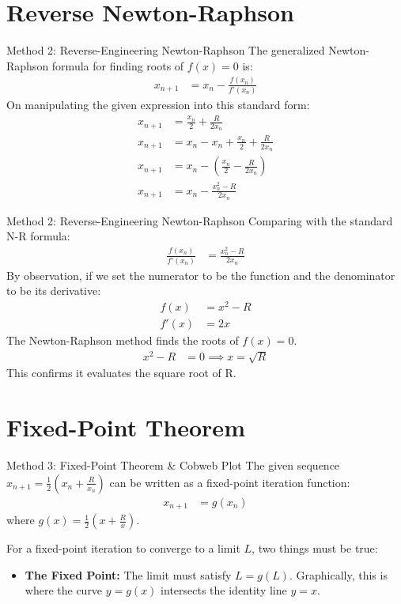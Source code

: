 \documentclass{beamer}
\theoremstyle{remark}
\numberwithin{equation}{section}
\begin{document}
\section{Reverse Newton-Raphson}
\begin{frame}{Method 2: Reverse-Engineering Newton-Raphson}
    The generalized Newton-Raphson formula for finding roots of $f(x) = 0$ is:
    \begin{align}
        x_{n+1} &= x_n - \frac{f(x_n)}{f'(x_n)}
    \end{align}
    On manipulating the given expression into this standard form:
    \begin{align}
        x_{n+1} &= \frac{x_n}{2} + \frac{R}{2x_n} \\
        x_{n+1} &= x_n - x_n + \frac{x_n}{2} + \frac{R}{2x_n} \\
        x_{n+1} &= x_n - \left( \frac{x_n}{2} - \frac{R}{2x_n} \right) \\
        x_{n+1} &= x_n - \frac{x_n^2 - R}{2x_n}
    \end{align}
\end{frame}

\begin{frame}{Method 2: Reverse-Engineering Newton-Raphson}
    Comparing with the standard N-R formula:
    \begin{align}
        \frac{f(x_n)}{f'(x_n)} &= \frac{x_n^2 - R}{2x_n}
    \end{align}
    By observation, if we set the numerator to be the function and the denominator to be its derivative:
    \begin{align}
        f(x) &= x^2 - R \\
        f'(x) &= 2x 
    \end{align}
    The Newton-Raphson method finds the roots of $f(x) = 0$. 
    \begin{align}
        x^2 - R &= 0 \implies x = \sqrt{R}
    \end{align}
    This confirms it evaluates the square root of R.
\end{frame}
\section{Fixed-Point Theorem}
\begin{frame}{Method 3: Fixed-Point Theorem \& Cobweb Plot}
    The given sequence $x_{n+1} = \frac{1}{2}\left(x_n + \frac{R}{x_n}\right)$ can be written as a fixed-point iteration function:
    \begin{align}
        x_{n+1} &= g(x_n)
    \end{align}
    where $g(x) = \frac{1}{2}\left(x + \frac{R}{x}\right)$.
    
    \vspace{0.5cm}
    For a fixed-point iteration to converge to a limit $L$, two things must be true:
    \begin{itemize}
        \item \textbf{The Fixed Point:} The limit must satisfy $L = g(L)$. Graphically, this is where the curve $y = g(x)$ intersects the identity line $y = x$.
    \end{itemize}
\end{frame}
\end{document}
